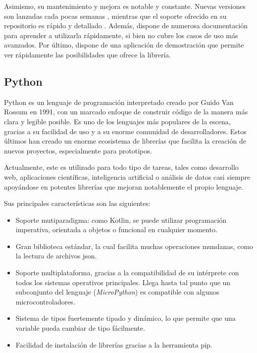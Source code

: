         
        Asimismo, su mantenimiento y mejora es notable y constante. Nuevas versiones son lanzadas cada pocas semanas \cite{goworowski_vico_2023-1}, mientras que el soporte ofrecido en su repositorio es rápido y detallado \cite{goworowski_vico_2023}. Además, dispone de numerosa documentación para aprender a utilizarla rápidamente, si bien no cubre los casos de uso más avanzados. Por último, dispone de una aplicación de demostración que permite ver rápidamente las posibilidades que ofrece la librería.

    \subsection{Python}
        Python es un lenguaje de programación interpretado creado por Guido Van Rossum en 1991, con un marcado enfoque de construir código de la manera más clara y legible posible. Es uno de los lenguajes más populares de la escena, gracias a su facilidad de uso y a su enorme comunidad de desarrolladores. Estos últimos han creado un enorme ecosistema de librerías que facilita la creación de nuevos proyectos, especialmente para prototipos.

        Actualmente, este es utilizado para todo tipo de tareas, tales como desarrollo web, aplicaciones científicas, inteligencia artificial o análisis de datos casi siempre apoyándose en potentes librerías que mejoran notablemente el propio lenguaje. 

        Sus principales características son las siguientes:
        \begin{itemize}
            \item Soporte mutiparadigma: como Kotlin, se puede utilizar programación imperativa, orientada a objetos o funcional en cualquier momento.
            \item Gran biblioteca estándar, la cual facilita muchas operaciones mundanas, como la lectura de archivos \gls{json}.
            \item Soporte multiplataforma, gracias a la compatibilidad de su intérprete con todos los sistemas operativos principales. Llega hasta tal punto que un subconjunto del lenguaje (\textit{MicroPython}) es compatible con algunos microcontroladores.
            \item Sistema de tipos fuertemente tipado y dinámico, lo que permite que una variable pueda cambiar de tipo fácilmente.
            \item Facilidad de instalación de librerías gracias a la herramienta pip.
        \end{itemize}
    
